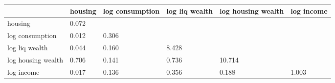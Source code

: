 \begin{table}[htbp]
\begin{tabular}{llllll} \hline \hline
 & housing  & log consumption  & log liq wealth  & log housing wealth  & log income  \\  \hline 
housing &     0.072 \\  
log consumption &     0.012 &     0.306 \\  
log liq wealth &     0.044 &     0.160 &     8.428 \\  
log housing wealth &     0.706 &     0.141 &     0.736 &    10.714 \\  
log income &     0.017 &     0.136 &     0.356 &     0.188 &     1.003 \\  
\hline \hline \end{tabular}
\end{table}
